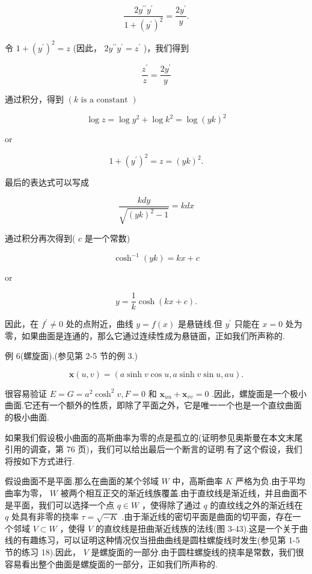\[
\frac{2{y}^{\prime \prime }{y}^{\prime }}{1 + {\left( {y}^{\prime }\right) }^{2}} = \frac{2{y}^{\prime }}{y}.
\]

令 \(1 + {\left( {y}^{\prime }\right) }^{2} = z\) (因此， \(2{y}^{\prime \prime }{y}^{\prime } = {z}^{\prime }\) )，我们得到

\[
\frac{{z}^{\prime }}{z} = \frac{2{y}^{\prime }}{y}
\]

通过积分，得到 \(\left( {k\text{ is a constant }}\right)\)

\[
\log z = \log {y}^{2} + \log {k}^{2} = \log {\left( yk\right) }^{2}
\]

or

\[
1 + {\left( {y}^{\prime }\right) }^{2} = z = {\left( yk\right) }^{2}.
\]

最后的表达式可以写成

\[
\frac{kdy}{\sqrt{{\left( yk\right) }^{2} - 1}} = {kdx}
\]

通过积分再次得到( \(c\) 是一个常数)

\[
{\cosh }^{-1}\left( {yk}\right)  = {kx} + c
\]

or

\[
y = \frac{1}{k}\cosh \left( {{kx} + c}\right) .
\]

因此，在 \({f}^{\prime } \neq  0\) 处的点附近，曲线 \(y = f\left( x\right)\) 是悬链线.但 \({y}^{\prime }\) 只能在 \(x = 0\) 处为零，如果曲面是连通的，那么它通过连续性成为悬链面，正如我们所声称的.

例 6(螺旋面).(参见第 2-5 节的例 3.)

\[
\mathbf{x}\left( {u,v}\right)  = \left( {a\sinh v\cos u,a\sinh v\sin u,{au}}\right) .
\]

很容易验证 \(E = G = {a}^{2}{\cosh }^{2}v,F = 0\) 和 \({\mathbf{x}}_{uu} + {\mathbf{x}}_{vv} = 0\) .因此，螺旋面是一个极小曲面.它还有一个额外的性质，即除了平面之外，它是唯一一个也是一个直纹曲面的极小曲面.

如果我们假设极小曲面的高斯曲率为零的点是孤立的(证明参见奥斯曼在本文末尾引用的调查，第 76 页)，我们可以给出最后一个断言的证明.有了这个假设，我们将按如下方式进行.

假设曲面不是平面.那么在曲面的某个邻域 \(W\) 中，高斯曲率 \(K\) 严格为负.由于平均曲率为零， \(W\) 被两个相互正交的渐近线族覆盖.由于直纹线是渐近线，并且曲面不是平面，我们可以选择一个点 \(q \in  W\) ，使得除了通过 \(q\) 的直纹线之外的渐近线在 \(q\) 处具有非零的挠率 \(\tau  = \sqrt{-K}\) .由于渐近线的密切平面是曲面的切平面，存在一个邻域 \(V \subset  W\) ，使得 \(V\) 的直纹线是扭曲渐近线族的法线(图 3-43).这是一个关于曲线的有趣练习，可以证明这种情况仅当扭曲曲线是圆柱螺旋线时发生(参见第 1-5 节的练习 18).因此， \(V\) 是螺旋面的一部分.由于圆柱螺旋线的挠率是常数，我们很容易看出整个曲面是螺旋面的一部分，正如我们所声称的.

